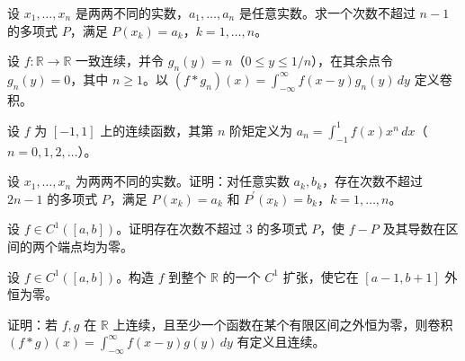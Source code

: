 \noindent\begin{minipage}{\textwidth}
设 $x_1,\ldots,x_n$ 是两两不同的实数，$a_1,\ldots,a_n$ 是任意实数。求一个次数不超过 $n-1$ 的多项式 $P$，满足 $P(x_k)=a_k$，$k=1,\ldots,n$。
\end{minipage}\par\vfill
\noindent\begin{minipage}{\textwidth}
设 $f:\mathbb R\to\mathbb R$ 一致连续，并令 $g_n(y)=n$（$0\le y\le1/n$），在其余点令 $g_n(y)=0$，其中 $n\ge1$。以 $(f*g_n)(x)=\int_{-\infty}^{\infty}f(x-y)g_n(y)\,dy$ 定义卷积。
\end{minipage}\par\vfill
\noindent\begin{minipage}{\textwidth}
设 $f$ 为 $[-1,1]$ 上的连续函数，其第 $n$ 阶矩定义为 $a_n=\int_{-1}^1f(x)x^n\,dx$（$n=0,1,2,\ldots$）。
\end{minipage}\par\vfill
\newpage
\noindent\begin{minipage}{\textwidth}
设 $x_1,\ldots,x_n$ 为两两不同的实数。证明：对任意实数 $a_k,b_k$，存在次数不超过 $2n-1$ 的多项式 $P$，满足 $P(x_k)=a_k$ 和 $P^{\prime}(x_k)=b_k$，$k=1,\ldots,n$。
\end{minipage}\par\vfill
\noindent\begin{minipage}{\textwidth}
设 $f\in C^1([a,b])$。证明存在次数不超过 $3$ 的多项式 $P$，使 $f-P$ 及其导数在区间的两个端点均为零。
\end{minipage}\par\vfill
\noindent\begin{minipage}{\textwidth}
设 $f\in C^1([a,b])$。构造 $f$ 到整个 $\mathbb R$ 的一个 $C^1$ 扩张，使它在 $[a-1,b+1]$ 外恒为零。
\end{minipage}\par\vfill
\noindent\begin{minipage}{\textwidth}
证明：若 $f,g$ 在 $\mathbb R$ 上连续，且至少一个函数在某个有限区间之外恒为零，则卷积 $(f*g)(x)=\int_{-\infty}^{\infty}f(x-y)g(y)\,dy$ 有定义且连续。
\end{minipage}\par\vfill
